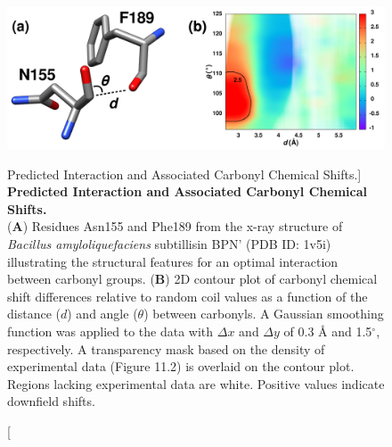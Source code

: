 \begin{figure}[ht!]
\includegraphics[width=6in]{figs/npistar/01-geometry.png}
\caption
      [Predicted \npistar{} Interaction and Associated Carbonyl \cnmr{}
       Chemical Shifts.]{
  {\bf Predicted \npistar{} Interaction and Associated Carbonyl \cnmr{}
       Chemical Shifts.
  }
  \\
  ({\bf A}) Residues Asn155 and Phe189 from the x-ray structure of
  \emph{Bacillus amyloliquefaciens} subtillisin BPN' (PDB ID: 1v5i)
  illustrating the structural features for an optimal \npistar{} interaction
  between carbonyl groups.
  ({\bf B}) 2D contour plot of carbonyl \cnmr{} chemical shift differences
  relative to random coil values as a function of the distance ($d$) and
  angle ($\theta$) between carbonyls. A Gaussian smoothing function was
  applied to the data with $\Delta x$ and $\Delta y$ of 0.3 \r{A} and
  1.5$^\circ$, respectively. A transparency mask based on the density of
  experimental data (Figure 11.2) is overlaid on the
  contour plot. Regions lacking experimental data are white.
  Positive values indicate downfield shifts.
}
\label{figure.11.1}
\end{figure}

